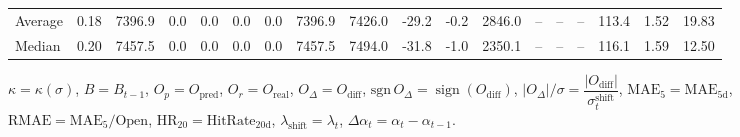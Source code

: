 \begin{threeparttable}
{\begin{tabular}{lrrrrrrrrrrrrrrrrr}
Average &     0.18 & 7396.9 &               0.0 &               0.0 &                0.0 &                0.0 & 7396.9 & 7426.0 &      -29.2 &                     -0.2 &              2846.0 &         -- &        -- &             -- &            113.4 &            1.52 &                  19.83 \\
 Median &     0.20 & 7457.5 &               0.0 &               0.0 &                0.0 &                0.0 & 7457.5 & 7494.0 &      -31.8 &                     -1.0 &              2350.1 &         -- &        -- &             -- &            116.1 &            1.59 &                  12.50 \\
\bottomrule
\end{tabular}
}
\begin{tablenotes}\footnotesize
\item $\kappa=\kappa(\sigma)$, $B=B_{t-1}$, $O_p=O_{\text{pred}}$, $O_r=O_{\text{real}}$, $O_\Delta=O_{\text{diff}}$, $\mathrm{sgn}\,O_\Delta=\operatorname{sign}(O_{\text{diff}})$, $|O_\Delta|/\sigma=\dfrac{|O_{\text{diff}}|}{\sigma_t^{\text{shift}}}$, $\mathrm{MAE}_5=\mathrm{MAE}_{5\text{d}}$, $\mathrm{RMAE}= \mathrm{MAE}_5 / \text{Open}$, $\mathrm{HR}_{20}=\mathrm{HitRate}_{20\text{d}}$, 
$\lambda_{\text{shift}}=\lambda_t$, 
$\Delta\alpha_t=\alpha_t-\alpha_{t-1}$.
\end{tablenotes}
\end{threeparttable}
\endgroup

